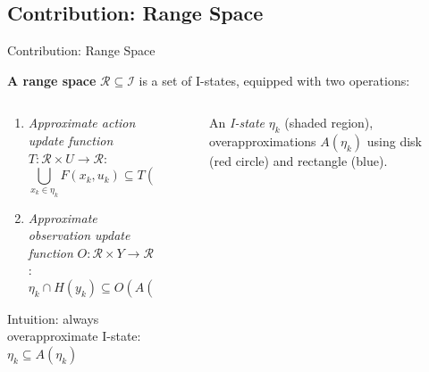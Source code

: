 \documentclass[10pt]{beamer}
\begin{document}
\subsection[Range Space]{Contribution: Range Space}
\begin{frame}{Contribution: Range Space}
  \begin{definition}{\textbf{A range space}}
    $\mathcal{R} \subseteq \mathcal{I}$ is a set of I-states, equipped with two
    operations:
  \end{definition}
  \begin{columns}
    \begin{column}{.5\textwidth}
      \begin{enumerate}
      \item \emph{Approximate action update function} $T: \mathcal{R} \times U \to
        \mathcal{R}$:
        $$\bigcup_{x_k \in \eta_k} F(x_k, u_k) \subseteq T(A(\eta_k), u_k)$$
      \item \emph{Approximate observation update function} $O: \mathcal{R} \times
        Y \to \mathcal{R}$:
        $$\eta_k \cap H(y_k) \subseteq O(A(\eta_k), u_k)$$
      \end{enumerate}
      \textcolor{scred}{Intuition: always overapproximate I-state:
        $\eta_k \subseteq A(\eta_k)$}
    \end{column}
    \begin{column}{.4\textwidth}
    \begin{figure}
    \caption{\scriptsize{An \emph{I-state} $\eta_k$ (shaded region),
        overapproximations $A(\eta_k)$ using disk (red circle) and rectangle
        (blue). }}
    \end{figure}
  \end{column}
\end{columns}
\end{frame}
\end{document}
